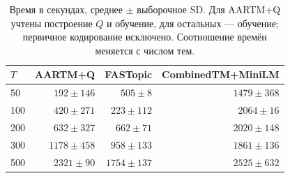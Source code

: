 \begin{table}[H]
\centering
\small
\caption{Время в секундах, среднее $\pm$ выборочное SD. Для AARTM+Q учтены построение $Q$ и обучение, для остальных --- обучение; первичное кодирование исключено. Соотношение времён меняется с числом тем.}
\label{tab:runtime}
\begin{tabular}{lrrr}
\toprule
$T$ & AARTM+Q & FASTopic & CombinedTM+MiniLM \\
\midrule
50 & $192\pm146$ & $505\pm8$ & $1479\pm368$ \\
100 & $420\pm271$ & $223\pm112$ & $2064\pm16$ \\
200 & $632\pm327$ & $662\pm71$ & $2020\pm148$ \\
300 & $1178\pm458$ & $958\pm133$ & $1861\pm136$ \\
500 & $2321\pm90$ & $1754\pm137$ & $2525\pm632$ \\
\bottomrule
\end{tabular}
\end{table}
